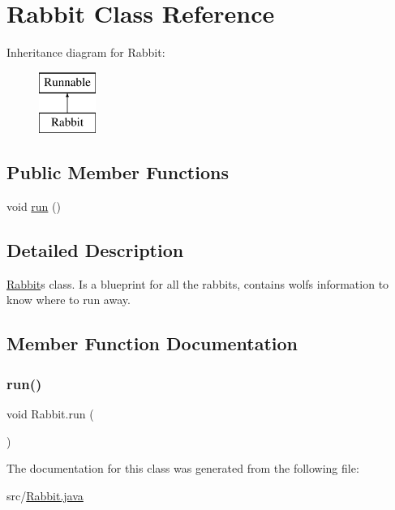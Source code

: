 \hypertarget{class_rabbit}{}\section{Rabbit Class Reference}
\label{class_rabbit}
Inheritance diagram for Rabbit\+:\begin{figure}[H]
\begin{center}
\leavevmode
\includegraphics[height=2.000000cm]{class_rabbit}
\end{center}
\end{figure}
\subsection*{Public Member Functions}
\begin{DoxyCompactItemize}
\item 
void \hyperlink{class_rabbit_af83ccda1dd4b52234d28aaffcd0b9bbd}{run} ()
\end{DoxyCompactItemize}


\subsection{Detailed Description}
\hyperlink{class_rabbit}{Rabbit}\textquotesingle{}s class. Is a blueprint for all the rabbits, contains wolf\textquotesingle{}s information to know where to run away. 

\subsection{Member Function Documentation}
\mbox{\label{class_rabbit_af83ccda1dd4b52234d28aaffcd0b9bbd}} 
\subsubsection{\texorpdfstring{run()}{run()}}
{\footnotesize\ttfamily void Rabbit.\+run (\begin{DoxyParamCaption}{ }\end{DoxyParamCaption})}



The documentation for this class was generated from the following file\+:\begin{DoxyCompactItemize}
\item 
src/\hyperlink{_rabbit_8java}{Rabbit.\+java}\end{DoxyCompactItemize}
